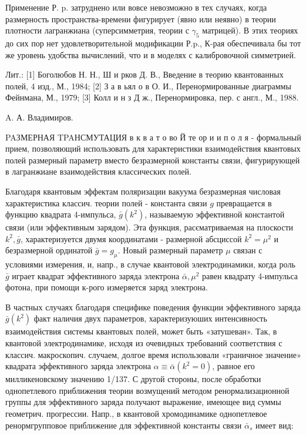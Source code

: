 \documentclass[10pt]{article}
\begin{document}
Применение Р. p. затруднено или вовсе невозможно в тех случаях, когда размерность пространства-времени фигурирует (явно или неявно) в теории плотности лагранжиана (суперсимметрия, теории с $\gamma_{5}$ матрицей). В этих теориях до сих пор нет удовлетворительной модификации Р.p., К-рая обеспечивала бы тот же уровень удобства вычислений, что и в моделях с калибровочной симметрией.



Лит.: [1] Боголюбов Н. Н., Ш и рков Д. В., Введение в теорию квантованных полей, 4 изд., М., 1984; [2] З а в ьял о в О. И., Перенормированные диаграммы Фейнмана, М., 1979; [3] Колл и н з Д ж., Перенормировка, пер. с англ., М., 1988.



A. А. Владимиров.



PAЗМЕРНАЯ TPAНСМУТАЦИЯ в к в а т о во Й те ор и и п о л я - формальный прием, позволяющий использовать для характеристики взаимодействия квантовых полей размерный параметр вместо безразмерной константы связи, фигурирующей в лагранжиане взаимодействия классических полей.



Благодаря квантовым эффектам поляризации вакуума безразмерная числовая характеристика классич. теории полей - константа связи $g$ превращается в функцию квадрата 4-импульса, $\bar{g}\left(k^{2}\right)$, называемую эффективной константой связи (или эффективным зарядом). Эта функция, расєматриваемая на плоскости $k^{2}, \bar{g}$, характеризуется двумя координатами - размерной абсциссой $k^{2}=\mu^{2}$ и безразмерной ординатой $\bar{g}=g_{\mu}$. Новый размерный параметр $\mu$ связан с условиями измерения, и, напр., в случае квантовой электродинамики, когда роль $\bar{g}$ играет квадрат эффективного заряда электрона $\bar{\alpha}, \mu^{2}$ равен квадрату 4-импульса фотона, при помощи к-рого измеряется заряд электрона.



В частных случаях благодаря специфике поведения функции эффективного заряда $\bar{g}\left(k^{2}\right)$ факт наличия двух параметров, характеризуюших интенсивность взаимодействия системы квантовых полей, может быть «затушеван». Так, в квантовой электродинамике, исходя из очевидных требований соответствия с классич. макроскопич. случаем, долгое время использовали «граничное значение» квадрата эффективного заряда электрона $\alpha \equiv \bar{\alpha}\left(k^{2}=0\right)$, равное его милликеновскому значению 1/137. С другой стороны, после обработки однопетлевого приближения теории возмущений методом ренормализационной группы для эффективного заряда получают выражение, имеющее вид суммы геометрич. прогрессии. Напр., в квантовой хромодинамике однопетлевое ренормгрупповое приближение для эффективной константы связи $\bar{\alpha}_{s}$ имеет вид:
\end{document}
